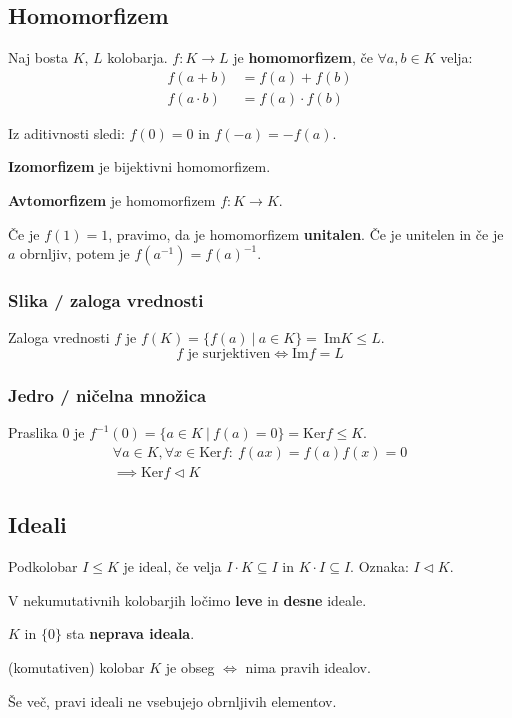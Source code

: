 \subsection*{Homomorfizem}
Naj bosta $K$, $L$ kolobarja. $f:K \to L$ je \textbf{homomorfizem}, če $\forall a, b \in K$ velja:
\begin{align*}
	f(a+b) &= f(a) + f(b)\\
	f(a \cdot b) &= f(a) \cdot f(b)
\end{align*}

Iz aditivnosti sledi: $f(0) = 0$ in $f(-a) = -f(a)$.


\textbf{Izomorfizem} je bijektivni homomorfizem.

\textbf{Avtomorfizem} je homomorfizem $f: K \to K$.

Če je $f(1) = 1$, pravimo, da je homomorfizem \textbf{unitalen}. Če je unitelen in če je $a$ obrnljiv, potem je $f(a^{-1}) = f(a)^{-1}$.

\subsubsection*{Slika / zaloga vrednosti}
Zaloga vrednosti $f$ je $f(K) = \{ f(a)\ |\ a \in K\} = \ \text{Im}K \leq L$.
\[ f \text{ je surjektiven} \iff \text{Im}f = L\]

\subsubsection*{Jedro / ničelna množica}
Praslika 0 je $f^{-1}(0) = \{ a \in K \ |\ f(a) = 0\} = \text{Ker}f \leq K$.
\begin{multline*}
	\forall a \in K, \forall x \in \text{Ker} f:\ f(ax) = f(a)f(x) = 0 \\
	\implies \text{Ker}f \lhd K
\end{multline*}

\subsection*{Ideali}
Podkolobar $I \leq K$ je ideal, če velja $I\cdot K \subseteq I$ in $K\cdot I \subseteq I$. Oznaka: $I \lhd K$.

V nekumutativnih kolobarjih ločimo \textbf{leve} in \textbf{desne} ideale.

$K$ in $\{0\}$ sta \textbf{neprava ideala}.

(komutativen) kolobar $K$ je obseg $\iff$ nima pravih idealov. 

Še več, pravi ideali ne vsebujejo obrnljivih elementov.

